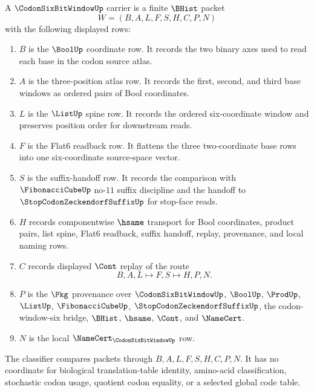 \begin{definition}
\label{def:codon-six-bit-window-carrier}
A $\CodonSixBitWindowUp$ carrier is a finite $\BHist$ packet
$$
W=(B,A,L,F,S,H,C,P,N)
$$
with the following displayed rows:
\begin{enumerate}
\item $B$ is the $\BoolUp$ coordinate row. It records the two binary axes used to read each base in the codon source atlas.
\item $A$ is the three-position atlas row. It records the first, second, and third base windows as ordered pairs of Bool coordinates.
\item $L$ is the $\ListUp$ spine row. It records the ordered six-coordinate window and preserves position order for downstream reads.
\item $F$ is the Flat6 readback row. It flattens the three two-coordinate base rows into one six-coordinate source-space vector.
\item $S$ is the suffix-handoff row. It records the comparison with $\FibonacciCubeUp$ no-$11$ suffix discipline and the handoff to $\StopCodonZeckendorfSuffixUp$ for stop-face reads.
\item $H$ records componentwise $\hsame$ transport for Bool coordinates, product pairs, list spine, Flat6 readback, suffix handoff, replay, provenance, and local naming rows.
\item $C$ records displayed $\Cont$ replay of the route
$$
B,A,L \longmapsto F,S \longmapsto H,P,N .
$$
\item $P$ is the $\Pkg$ provenance over $\CodonSixBitWindowUp$, $\BoolUp$, $\ProdUp$, $\ListUp$, $\FibonacciCubeUp$, $\StopCodonZeckendorfSuffixUp$, the codon-window-six bridge, $\BHist$, $\hsame$, $\Cont$, and $\NameCert$.
\item $N$ is the local $\NameCert_{\CodonSixBitWindowUp}$ row.
\end{enumerate}
The classifier compares packets through $B,A,L,F,S,H,C,P,N$. It has no coordinate for biological translation-table identity, amino-acid classification, stochastic codon usage, quotient codon equality, or a selected global code table.
\end{definition}

